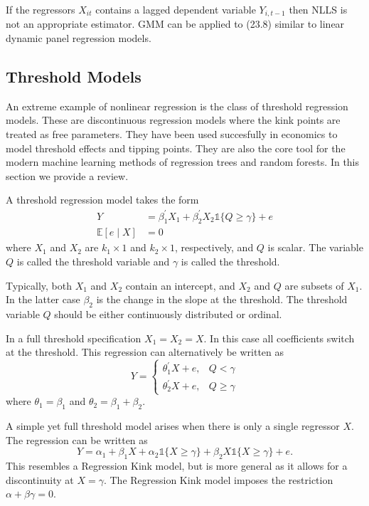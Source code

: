 \documentclass[10pt]{article}
\begin{document}
If the regressors $X_{i t}$ contains a lagged dependent variable $Y_{i, t-1}$ then NLLS is not an appropriate estimator. GMM can be applied to (23.8) similar to linear dynamic panel regression models.

\subsection{Threshold Models}
An extreme example of nonlinear regression is the class of threshold regression models. These are discontinuous regression models where the kink points are treated as free parameters. They have been used succesfully in economics to model threshold effects and tipping points. They are also the core tool for the modern machine learning methods of regression trees and random forests. In this section we provide a review.

A threshold regression model takes the form
$$
\begin{aligned}
Y &=\beta_{1}^{\prime} X_{1}+\beta_{2}^{\prime} X_{2} \mathbb{1}\{Q \geq \gamma\}+e \\
\mathbb{E}[e \mid X] &=0
\end{aligned}
$$
where $X_{1}$ and $X_{2}$ are $k_{1} \times 1$ and $k_{2} \times 1$, respectively, and $Q$ is scalar. The variable $Q$ is called the threshold variable and $\gamma$ is called the threshold.

Typically, both $X_{1}$ and $X_{2}$ contain an intercept, and $X_{2}$ and $Q$ are subsets of $X_{1}$. In the latter case $\beta_{2}$ is the change in the slope at the threshold. The threshold variable $Q$ should be either continuously distributed or ordinal.

In a full threshold specification $X_{1}=X_{2}=X$. In this case all coefficients switch at the threshold. This regression can alternatively be written as
$$
Y=\left\{\begin{array}{cc}
\theta_{1}^{\prime} X+e, & Q<\gamma \\
\theta_{2}^{\prime} X+e, & Q \geq \gamma
\end{array}\right.
$$
where $\theta_{1}=\beta_{1}$ and $\theta_{2}=\beta_{1}+\beta_{2}$.

A simple yet full threshold model arises when there is only a single regressor $X$. The regression can be written as
$$
Y=\alpha_{1}+\beta_{1} X+\alpha_{2} \mathbb{1}\{X \geq \gamma\}+\beta_{2} X \mathbb{1}\{X \geq \gamma\}+e .
$$
This resembles a Regression Kink model, but is more general as it allows for a discontinuity at $X=\gamma$. The Regression Kink model imposes the restriction $\alpha+\beta \gamma=0$.
\end{document}
